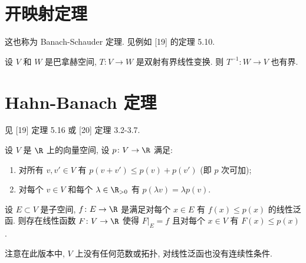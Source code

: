 \section{开映射定理}
这也称为 Banach-Schauder 定理. 见例如 {[}19{]} 的定理 5.10.

\begin{theorem}
\label{thm:B.2.1}
设 $V$ 和 $W$ 是巴拿赫空间, $T \colon V \to W$ 是双射有界线性变换. 则 $T^{-1} \colon W \to V$ 也有界.
\end{theorem}

\section{Hahn-Banach 定理}
见 {[}19{]} 定理 5.16 或 {[}20{]} 定理 3.2-3.7.

\begin{theorem}
\label{thm:B.3.1}
设 $V$ 是 $\R$ 上的向量空间, 设 $p \colon V \to \R$ 满足:
\begin{enumerate}
\item[(a)] 对所有 $v, v' \in V$ 有 $p(v + v') \leq p(v) + p(v')$ (即 $p$ 次可加);
\item[(b)] 对每个 $v \in V$ 和每个 $\lambda \in \R_{>0}$ 有 $p(\lambda v) = \lambda p(v)$.
\end{enumerate}
设 $E \subset V$ 是子空间, $f \colon E \to \R$ 是满足对每个 $x \in E$ 有 $f(x) \leq p(x)$ 的线性泛函.
则存在线性函数 $F \colon V \to \R$ 使得 $F|_E = f$ 且对每个 $x \in V$ 有 $F(x) \leq p(x)$.
\end{theorem}

注意在此版本中, $V$ 上没有任何范数或拓扑, 对线性泛函也没有连续性条件.

